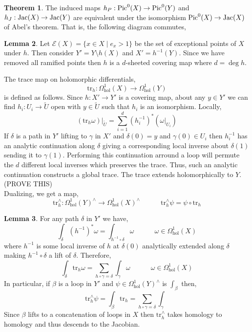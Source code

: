 \documentclass{article}
\theoremstyle{definition}
\newtheorem{theorem}{Theorem}[section]
\newtheorem{lemma}[theorem]{Lemma}
\newenvironment{definition}[1][Definition:]{\begin{trivlist}
\item[\hskip \labelsep {\bfseries #1}]}{\end{trivlist}}
\begin{document}
\begin{theorem}
The induced maps $h_P : \mathrm{Pic}^0(X) \to \mathrm{Pic}^0(Y)$ and $h_J : \mathrm{Jac}(X) \to \mathrm{Jac}(Y)$ are equivalent under the isomorphism $\mathrm{Pic}^0(X) \to \mathrm{Jac}(X)$ of Abel's theorem. That is, the following diagram commutes,
\begin{center}
\end{center}
\end{theorem}

\begin{lemma}
Let $\mathcal{E}(X) = \{ x \in X \mid e_x > 1 \}$ be the set of exceptional points of $X$ under $h$. Then consider $Y' = Y \setminus h(X)$ and $X' = h^{-1}(Y)$. Since we have removed all ramified points then $h$ is a $d$-sheeted covering map where $d = \deg{h}$. 
\end{lemma}

\renewcommand{\tr}{\mathrm{tr}}

\begin{definition}
The trace map on holomorphic differentials,
\[ \tr_h : \Omega^1_{\text{hol}}(X) \to \Omega^1_{\text{hol}}(Y) \]
is defined as follows. Since $h : X' \to Y'$ is a covering map, about any $y \in Y'$ we can find $h_i : U_i \to \tilde{U}$ open with $y \in \tilde{U}$ such that $h_i$ is an isomorphism. Locally,
\[ (\tr_h \omega)|_{\tilde{U}} = \sum_{ i = 1 }^d (h_i^{-1})^*(\omega|_{U_i}) \]
If $\delta$ is a path in $Y'$ lifting to $\gamma$ in $X'$ and $\delta(0) = y$ and $\gamma(0) \in U_i$ then $h_i^{-1}$ has an analytic continuation along $\delta$ giving a corresponding local inverse about $\delta(1)$ sending it to $\gamma(1)$. Performing this continuation arround a loop will permute the $d$ different local inverses which preserves the trace. Thus, such an analytic continuation constructs a global trace. The trace extends holomorphically to $Y$. (PROVE THIS)
\bigskip\\
Dualizing, we get a map,
\[ \tr_h^\wedge : \Omega^1_{\text{hol}}(Y)^\wedge \to \Omega^1_{\text{hol}}(X)^\wedge \quad \quad \quad \tr_h^\wedge \psi = \psi \circ \tr_h \]
\end{definition}

\begin{lemma}
For any path $\delta$ in $Y'$ we have,
\[ \int_\delta (h^{-1})^* \omega = \int_{h^{-1} \circ \delta} \omega \quad \quad \quad \omega \in \Omega^1_{\text{hol}}(X) \]
where $h^{-1}$ is some local inverse of $h$ at $\delta(0)$ analytically extended along $\delta$ making $h^{-1} \circ \delta$ a lift of $\delta$. Therefore,
\[ \int_\delta \tr_h \omega = \sum_{h \circ \gamma = \delta} \int_\gamma \omega \quad \quad \quad \omega \in \Omega^1_{\text{hol}}(X)\]
In particular, if $\beta$ is a loop in $Y'$ and $\psi \in \Omega^1_{\text{hol}}(Y)^\wedge$ is $\int_\beta$ then,
\[ \tr_h^\wedge \psi = \int_\beta \tr_h = \sum_{h \circ \gamma = \delta} \int_\gamma \]
Since $\beta$ lifts to a concatenation of loops in $X$ then $\tr_h^\wedge$ takes homology to homology and thus descends to the Jacobian.
\end{lemma}
\end{document}
